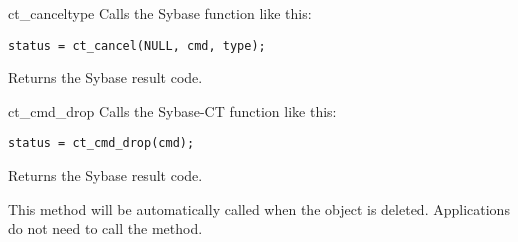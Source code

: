 \begin{methoddesc}[CS_COMMAND]{ct_cancel}{type}
Calls the Sybase  function like this:

\begin{verbatim}
status = ct_cancel(NULL, cmd, type);
\end{verbatim}

Returns the Sybase result code.
\end{methoddesc}

\begin{methoddesc}[CS_COMMAND]{ct_cmd_drop}{}
Calls the Sybase-CT  function like this:

\begin{verbatim}
status = ct_cmd_drop(cmd);
\end{verbatim}

Returns the Sybase result code.

This method will be automatically called when the 
object is deleted.  Applications do not need to call the method.
\end{methoddesc}

